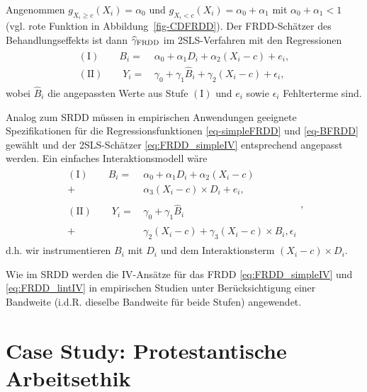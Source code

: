 \documentclass[
  a4paper,
  DIV=11,
  oneside]{scrreprt}
\begin{document}
Angenommen \(g_{X_i\geq c}(X_i) = \alpha_0\) und
\(g_{X_i<c}(X_i) = \alpha_0 + \alpha_1\) mit \(\alpha_0 + \alpha_1 < 1\)
(vgl. rote Funktion in Abbildung~\ref{fig-CDFRDD}). Der FRDD-Schätzer
des Behandlungseffekts ist dann \(\widehat{\gamma}_\textup{FRDD}\) im
2SLS-Verfahren mit den Regressionen \begin{align}
  \begin{split}
  (\mathrm{I})\qquad B_i =&\, \alpha_0 + \alpha_1 D_i + \alpha_2 (X_i - c) + e_i,\\
  (\mathrm{II})\qquad Y_i =&\, \gamma_0 + \gamma_1 \widehat{B}_i + \gamma_2 (X_i - c) + \epsilon_i,
  \end{split}\label{eq:FRDD_simpleIV}
\end{align} wobei \(\widehat{B}_i\) die angepassten Werte aus Stufe
\((\mathrm I)\) und \(e_i\) sowie \(\epsilon_i\) Fehlterterme sind.

Analog zum SRDD müssen in empirischen Anwendungen geeignete
Spezifikationen für die Regressionsfunktionen \eqref{eq-simpleFRDD} und
\eqref{eq-BFRDD} gewählt und der 2SLS-Schätzer \eqref{eq:FRDD_simpleIV}
entsprechend angepasst werden. Ein einfaches Interaktionsmodell wäre
\begin{align}
  \begin{split}
  (\mathrm{I})\qquad B_i =&\, \alpha_0 + \alpha_1 D_i + \alpha_2 (X_i - c)\\ 
  +&\, \alpha_3 (X_i - c) \times D_i + e_i,\\
  \\
  (\mathrm{II})\qquad Y_i =&\, \gamma_0 + \gamma_1 \widehat{B}_i\\
  +&\, \gamma_2 (X_i - c) + \gamma_3 (X_i-c)\times\widehat{B}_i, \epsilon_i
  \end{split},\label{eq:FRDD_lintIV}
\end{align} d.h. wir instrumentieren \(B_i\) mit \(D_i\) und dem
Interaktionsterm \((X_i-c)\times D_i\).

Wie im SRDD werden die IV-Ansätze für das FRDD \eqref{eq:FRDD_simpleIV}
und \eqref{eq:FRDD_lintIV} in empirischen Studien unter Berücksichtigung
einer Bandweite (i.d.R. dieselbe Bandweite für beide Stufen) angewendet.

\section{Case Study: Protestantische
Arbeitsethik}\label{case-study-protestantische-arbeitsethik}
\end{document}
